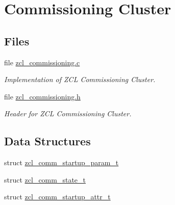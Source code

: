 \hypertarget{group__zcl__commissioning}{\section{Commissioning Cluster}
\label{group__zcl__commissioning}
}
\subsection*{Files}
\begin{DoxyCompactItemize}
\item 
file \hyperlink{zcl__commissioning_8c}{zcl\-\_\-commissioning.\-c}
\begin{DoxyCompactList}\small\item\em Implementation of Z\-C\-L Commissioning Cluster. \end{DoxyCompactList}\item 
file \hyperlink{zcl__commissioning_8h}{zcl\-\_\-commissioning.\-h}
\begin{DoxyCompactList}\small\item\em Header for Z\-C\-L Commissioning Cluster. \end{DoxyCompactList}\end{DoxyCompactItemize}
\subsection*{Data Structures}
\begin{DoxyCompactItemize}
\item 
struct \hyperlink{structzcl__comm__startup__param__t}{zcl\-\_\-comm\-\_\-startup\-\_\-param\-\_\-t}
\item 
struct \hyperlink{structzcl__comm__state__t}{zcl\-\_\-comm\-\_\-state\-\_\-t}
\item 
struct \hyperlink{structzcl__comm__startup__attr__t}{zcl\-\_\-comm\-\_\-startup\-\_\-attr\-\_\-t}
\end{DoxyCompactItemize}

